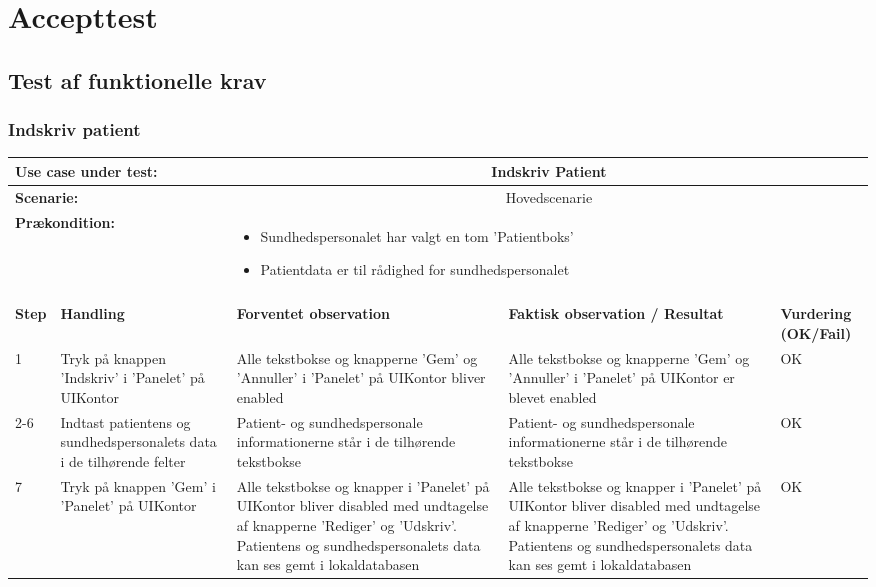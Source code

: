 \chapter{Accepttest}
\section{Test af funktionelle krav}
\subsection{Indskriv patient}
\begin{tabular}{|p{1cm}|p{3cm}|p{4cm}|p{4cm}|p{2cm}|}
\hline
\multicolumn{2}{|p{3cm}|}{\textbf{Use case under test:}} & \multicolumn{3}{c|}{Indskriv Patient} \\\hline

\multicolumn{2}{|p{3cm}|}{\textbf{Scenarie:}} & \multicolumn{3}{c|}{Hovedscenarie} \\\hline

\multicolumn{2}{|p{3cm}|}{\textbf{Prækondition:}}  & \multicolumn{3}{l|}{\parbox{0.6\textwidth}{
\begin{itemize}[label=$\circ$]
\item Sundhedspersonalet har valgt en tom 'Patientboks' 
\item Patientdata er til rådighed for sundhedspersonalet 
\end{itemize} }}\\\hline

\multicolumn{5}{|c|}{} \\\hline

\textbf{Step} & \textbf{Handling} & \textbf{Forventet observation} & \textbf{Faktisk observation / Resultat} & \textbf{Vurdering (OK/Fail)}\\\hline

1 & Tryk på knappen 'Indskriv' i 'Panelet' på UIKontor & Alle tekstbokse og knapperne 'Gem' og 'Annuller' i 'Panelet' på UIKontor bliver enabled & Alle tekstbokse og knapperne 'Gem' og 'Annuller' i 'Panelet' på UIKontor er blevet enabled & OK \\\hline

2-6 & Indtast patientens og sundhedspersonalets data i de tilhørende felter & Patient- og sundhedspersonale informationerne står i de tilhørende tekstbokse & Patient- og sundhedspersonale informationerne står i de tilhørende tekstbokse & OK \\\hline

7 & Tryk på knappen 'Gem' i 'Panelet' på UIKontor & Alle tekstbokse og knapper i 'Panelet' på UIKontor bliver disabled med undtagelse af knapperne 'Rediger' og 'Udskriv'. Patientens og sundhedspersonalets  data kan ses gemt i lokaldatabasen & Alle tekstbokse og knapper i 'Panelet' på UIKontor bliver disabled med undtagelse af knapperne 'Rediger' og 'Udskriv'. Patientens og sundhedspersonalets  data kan ses gemt i lokaldatabasen & OK \\\hline

\end{tabular}
\\

